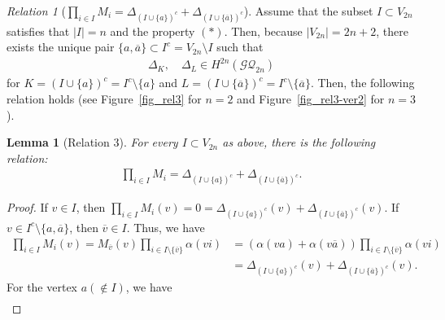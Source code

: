 \documentclass[12pt]{amsart}
\newtheorem{lemma}[theorem]{Lemma}
\theoremstyle{remark}
\newtheorem{relation}{Relation}
\numberwithin{equation}{section}
\begin{document}
\begin{relation}[$\prod_{i\in I}M_{i}=\Delta_{(I\cup \{a\})^{c}}+\Delta_{(I\cup \{\overline{a}\})^{c}}$]
\label{relation3}
Assume that the subset $I\subset V_{2n}$ satisfies that $|I|=n$ and the property $(\ast)$. 
Then, because $|V_{2n}|=2n+2$, there exists the unique pair $\{a,\overline{a}\}\subset I^{c}=V_{2n}\setminus I$ such that
\begin{align*}
\Delta_{K},\quad \Delta_{L}\in H^{2n}(\mathcal{GQ}_{2n})
\end{align*}
for 
$K=(I\cup \{a\})^{c}=I^{c}\setminus \{a\}$ and $L=(I\cup \{\overline{a}\})^{c}=I^{c}\setminus \{\overline{a}\}$.
Then, the following relation holds (see Figure~\ref{fig_rel3} for $n=2$ and Figure~\ref{fig_rel3-ver2} for $n=3$).
\begin{lemma}[Relation 3]
\label{lem-for-rel3}
For every $I\subset V_{2n}$ as above, %
there is the following relation:
\begin{align}
\label{3rd-rel}
\prod_{i\in I} M_{i}=\Delta_{(I\cup \{a\})^{c}}+\Delta_{(I\cup \{\overline{a}\})^{c}}.
\end{align} 
\end{lemma}
\begin{proof}
If $v\in I$, then  
$\prod_{i\in I} M_{i}(v)=0=\Delta_{(I\cup \{a\})^{c}}(v)+\Delta_{(I\cup \{\overline{a}\})^{c}}(v).$
If $v\in I^{c}\setminus \{a,\overline{a}\}$, 
then $\overline{v}\in I$.
Thus, we have
\begin{align*}
\prod_{i\in I} M_{i}(v)=%
M_{\overline{v}}(v)\prod_{i\in I\setminus\{\overline{v}\}}\alpha(vi)
&=(\alpha(va)+\alpha(v\overline{a}))\prod_{i\in I\setminus\{\overline{v}\}}\alpha(vi) \\
&=\Delta_{(I\cup \{a\})^{c}}(v)+\Delta_{(I\cup \{\overline{a}\})^{c}}(v).
\end{align*}
For the vertex $a(\not\in I)$, we have 
\begin{align*}

\end{align*}
\end{proof}
\end{relation}
\end{document}
